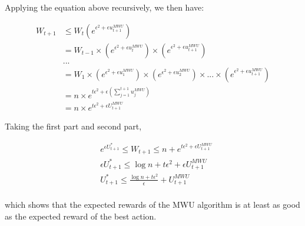 \documentclass[12pt]{article}
\begin{document}
Applying the equation above recursively, we then have:

\begin{equation*}
\begin{aligned}
W_{t+1} &\leq W_t (e^{\epsilon^2 + \epsilon u^{MWU}_{t+1}})\\
&= W_{t -1} \times (e^{\epsilon^2 + \epsilon u^{MWU}_{t}}) \times (e^{\epsilon^2 + \epsilon u^{MWU}_{t+1}})\\
& ...\\
&= W_1 \times  (e^{\epsilon^2 + \epsilon u^{MWU}_{1}}) \times  (e^{\epsilon^2 + \epsilon u^{MWU}_{2}}) \times ... \times (e^{\epsilon^2 + \epsilon u^{MWU}_{t+1}})\\
&= n \times e^{t\epsilon^2 + \epsilon(\sum^{t+1}_{j=1} u^{MWU}_{j})} \\
&= n \times e^{t\epsilon^2 + \epsilon U^{MWU}_{t+1}} 
\end{aligned}
\end{equation*}

Taking the first part and second part,

\begin{equation*}
\begin{aligned}
& e^{\epsilon U^*_{t+1}} \leq W_{t+1} \leq n + e^{t\epsilon^2 + \epsilon U^{MWU}_{t+1}}\\
& \epsilon U^*_{t+1} \leq \log n +  t\epsilon^2 + \epsilon U^{MWU}_{t+1} \\
& U^*_{t+1} \leq \frac{\log n +  t\epsilon^2}{\epsilon} + U^{MWU}_{t+1} \\
\end{aligned}
\end{equation*}

which shows that the expected rewards of the MWU algorithm is at least as good as the expected reward of the best action.
\end{document}
